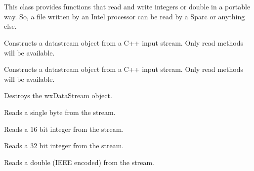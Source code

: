 \section{}\label{wxdatastream}

This class provides functions that read and write integers or double in a
portable way. So, a file written by an Intel processor can be read by a
Sparc or anything else.


\label{wxwaveconstr}


Constructs a datastream object from a C++ input stream. Only read methods will
be available.




Constructs a datastream object from a C++ input stream. Only read methods will
be available.





Destroys the wxDataStream object.



Reads a single byte from the stream.



Reads a 16 bit integer from the stream.



Reads a 32 bit integer from the stream.



Reads a double (IEEE encoded) from the stream.


